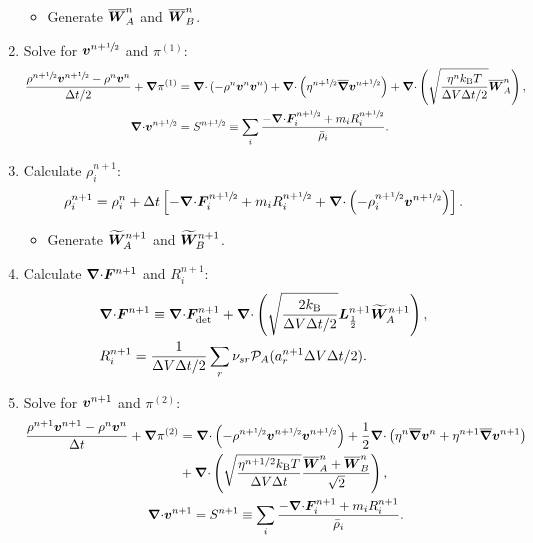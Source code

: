 \documentclass[
10pt
showpacs, showkeys,
amsmath,amssymb,
aps,
pre,
floatfix,
]{revtex4-1}
\newcommand{\divg}{{\V\nabla\cdot}}                       %
\newcommand{\paren}[1]{{(#1)}}                            %
\begin{document}
\begin{enumerate}
\begin{itemize}
\item Generate $\overline{\boldsymbol{W}}^n_A$ and $\overline{\boldsymbol{W}}^n_B$.
\end{itemize}

\item Solve for $\boldsymbol{v}^{n+\sfrac{1}{2}}$ and $\pi^\paren{1}$:
\begin{align}
\label{inertial_stokes_v_1st}
\frac{\rho^{n+\myhalf}\V{v}^{n+\myhalf}-\rho^n\V{v}^n}{\D{t}/2} + \grad\pi^\paren{1}
& = \divg\left(-\rho^n\V{v}^n\V{v}^n\right) + \divg\left( \eta^{n+\myhalf} \overline{\grad}\V{v}^{n+\myhalf} \right)
+ \divg\left( \sqrt{\frac{\eta^n k_\mathrm{B}T}{\D{V}\D{t}/2} } \overline{\V{W}}^n_A \right),
\\
\label{inertial_stokes_p_1st}
\divg\V{v}^{n+\myhalf}
& = S^{n+\myhalf}\equiv \sum_i \frac{-\divg\V{F}^{n+\myhalf}_i + m_i R^{n+\myhalf}_i }{\bar{\rho}_i}.
\end{align}

\item Calculate $\rho^{n+1}_i$:
\begin{equation}
\rho^{n+1}_i = \rho^n_i + \D{t} \left[ -\divg\V{F}^{n+\myhalf}_i + m_i R^{n+\myhalf}_i + \divg\left( -\rho^{n+\myhalf}_i \V{v}^{n+\myhalf} \right) \right].
\end{equation} 

\begin{itemize}
\item Generate $\widetilde{\boldsymbol{W}}^{n+1}_A$ and $\widetilde{\boldsymbol{W}}^{n+1}_B$.
\end{itemize}

\item Calculate $\divg\V{F}^{n+1}$ and $R^{n+1}_i$:
\begin{align}
\label{inertial_fluxdiv_2nd}
& \divg\V{F}^{n+1} \equiv \divg\V{F}_\mathrm{det}^{n+1} + \divg\left( \sqrt{ \frac{2k_\mathrm{B}}{\D{V}\D{t}/2} } \V{L}^{n+1}_{\frac12} \widetilde{\V{W}}^{n+1}_A \right), \\
\label{inertial_chemrate_2nd}
& R^{n+1}_i = \frac{1}{\D{V}\D{t}/2}\sum_r \nu_{sr}\mathcal{P}_A(a^{n+1}_r\D{V}\D{t}/2).
\end{align}

\item Solve for $\boldsymbol{v}^{n+1}$ and $\pi^\paren{2}$:
\begin{gather}
\label{inertial_stokes_v_2nd}
\begin{split}
\frac{\rho^{n+1}\V{v}^{n+1}-\rho^n\V{v}^n}{\D{t}} + \grad\pi^\paren{2}
&= \divg\left(-\rho^{n+\myhalf}\V{v}^{n+\myhalf}\V{v}^{n+\myhalf}\right) + \frac{1}{2}\divg\left( \eta^n \overline{\grad}\V{v}^n + \eta^{n+1} \overline{\grad}\V{v}^{n+1} \right) \\
&+ \divg\left( \sqrt{\frac{\eta^{n+1/2} k_\mathrm{B}T}{\D{V}\D{t}} } \frac{\overline{\V{W}}^n_A + \overline{\V{W}}^n_B}{\sqrt{2}} \right),
\end{split} \\
\label{inertial_stokes_p_2nd}
\divg\V{v}^{n+1}=S^{n+1}\equiv \sum_i \frac{-\divg\V{F}^{n+1}_i + m_i R^{n+1}_i }{\bar{\rho}_i}.
\end{gather}

\end{enumerate}
\end{document}
